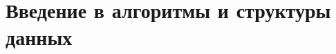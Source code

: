 \documentclass[../../book-ru.tex]{subfiles}
\begin{document}
\chapter{Введение в алгоритмы и структуры данных}
\label{ch:1.3-algorithms-ds-ru}














\end{document}

